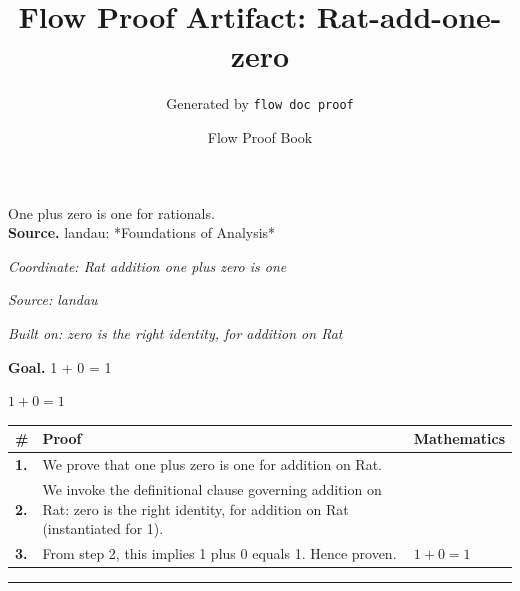 \documentclass[11pt]{article}
\title{Flow Proof Artifact: Rat-add-one-zero}
\author{Generated by \texttt{flow doc proof}}
\date{Flow Proof Book}
\theoremstyle{definition}
\begin{document}
\maketitle
One plus zero is one for rationals.\\[0.5em]
\textbf{Source.} landau: *Foundations of Analysis*\\[0.5em]
\bigskip
{}\par
\smallskip\noindent\textit{Coordinate: Rat \cdot addition \cdot one plus zero is one}\par
\smallskip\noindent\textit{Source: landau}\par
\smallskip\noindent\textit{Built on: zero is the right identity, for addition on Rat}\par
\medskip
\noindent\textbf{Goal.} 1 + 0 = 1\par
\noindent$\displaystyle 1 + 0 = 1$\par
\medskip
\noindent
\begin{tabular}{@{} >{\raggedright\arraybackslash}p{} >{\raggedright\arraybackslash}p{} >{\raggedleft\arraybackslash}p{} @{}}
\textbf{\#} & \textbf{Proof} & \textbf{Mathematics} \\
\midrule
\textbf{1.} & We prove that one plus zero is one for addition on Rat. & \\[0.45em]
\textbf{2.} & We invoke the definitional clause governing addition on Rat: zero is the right identity, for addition on Rat (instantiated for 1). & \\[0.45em]
\textbf{3.} & From step 2, this implies 1 plus 0 equals 1. Hence proven. & $\displaystyle 1 + 0 = 1$ \\[0.45em]
\bottomrule
\end{tabular}
\label{thm:Rat-addition-one_plus_zero_is_one}
\par\medskip\hrule
\end{document}
